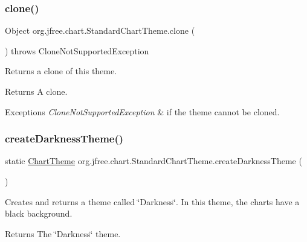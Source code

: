 \subsubsection{\texorpdfstring{clone()}{clone()}}
{\footnotesize\ttfamily Object org.\+jfree.\+chart.\+Standard\+Chart\+Theme.\+clone (\begin{DoxyParamCaption}{ }\end{DoxyParamCaption}) throws Clone\+Not\+Supported\+Exception}

Returns a clone of this theme.

\begin{DoxyReturn}{Returns}
A clone.
\end{DoxyReturn}

\begin{DoxyExceptions}{Exceptions}
{\em Clone\+Not\+Supported\+Exception} & if the theme cannot be cloned. \\
\hline
\end{DoxyExceptions}
\mbox{\label{classorg_1_1jfree_1_1chart_1_1_standard_chart_theme_ab6dc4ddda841c118c4cf282d6f78c8cf}} 
\subsubsection{\texorpdfstring{create\+Darkness\+Theme()}{createDarknessTheme()}}
{\footnotesize\ttfamily static \mbox{\hyperlink{interfaceorg_1_1jfree_1_1chart_1_1_chart_theme}{Chart\+Theme}} org.\+jfree.\+chart.\+Standard\+Chart\+Theme.\+create\+Darkness\+Theme (\begin{DoxyParamCaption}{ }\end{DoxyParamCaption})\hspace{0.3cm}{\ttfamily [static]}}

Creates and returns a theme called \char`\"{}\+Darkness\char`\"{}. In this theme, the charts have a black background.

\begin{DoxyReturn}{Returns}
The \char`\"{}\+Darkness\char`\"{} theme. 
\end{DoxyReturn}
\mbox{\label{classorg_1_1jfree_1_1chart_1_1_standard_chart_theme_ae1f9cd15756ffd50d1dc606e099dc610}} 
